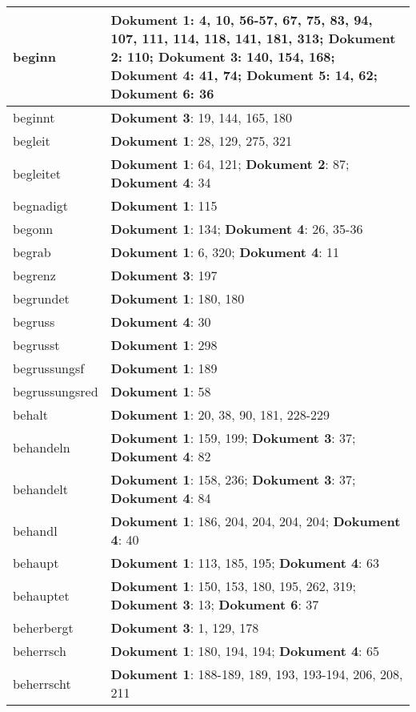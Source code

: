 \documentclass[a5paper]{article}
\begin{document}
\begin{longtable}[l]{|l|p{3in}|}
\hline
beginn & \textbf{Dokument 1}: 4, 10, 56-57, 67, 75, 83, 94, 107, 111, 114, 118, 141, 181, 313; \textbf{Dokument 2}: 110; \textbf{Dokument 3}: 140, 154, 168; \textbf{Dokument 4}: 41, 74; \textbf{Dokument 5}: 14, 62; \textbf{Dokument 6}: 36 \\
\hline
beginnt & \textbf{Dokument 3}: 19, 144, 165, 180 \\
\hline
begleit & \textbf{Dokument 1}: 28, 129, 275, 321 \\
\hline
begleitet & \textbf{Dokument 1}: 64, 121; \textbf{Dokument 2}: 87; \textbf{Dokument 4}: 34 \\
\hline
begnadigt & \textbf{Dokument 1}: 115 \\
\hline
begonn & \textbf{Dokument 1}: 134; \textbf{Dokument 4}: 26, 35-36 \\
\hline
begrab & \textbf{Dokument 1}: 6, 320; \textbf{Dokument 4}: 11 \\
\hline
begrenz & \textbf{Dokument 3}: 197 \\
\hline
begrundet & \textbf{Dokument 1}: 180, 180 \\
\hline
begruss & \textbf{Dokument 4}: 30 \\
\hline
begrusst & \textbf{Dokument 1}: 298 \\
\hline
begrussungsf & \textbf{Dokument 1}: 189 \\
\hline
begrussungsred & \textbf{Dokument 1}: 58 \\
\hline
behalt & \textbf{Dokument 1}: 20, 38, 90, 181, 228-229 \\
\hline
behandeln & \textbf{Dokument 1}: 159, 199; \textbf{Dokument 3}: 37; \textbf{Dokument 4}: 82 \\
\hline
behandelt & \textbf{Dokument 1}: 158, 236; \textbf{Dokument 3}: 37; \textbf{Dokument 4}: 84 \\
\hline
behandl & \textbf{Dokument 1}: 186, 204, 204, 204, 204; \textbf{Dokument 4}: 40 \\
\hline
behaupt & \textbf{Dokument 1}: 113, 185, 195; \textbf{Dokument 4}: 63 \\
\hline
behauptet & \textbf{Dokument 1}: 150, 153, 180, 195, 262, 319; \textbf{Dokument 3}: 13; \textbf{Dokument 6}: 37 \\
\hline
beherbergt & \textbf{Dokument 3}: 1, 129, 178 \\
\hline
beherrsch & \textbf{Dokument 1}: 180, 194, 194; \textbf{Dokument 4}: 65 \\
\hline
beherrscht & \textbf{Dokument 1}: 188-189, 189, 193, 193-194, 206, 208, 211 \\

\end{longtable}
\end{document}
